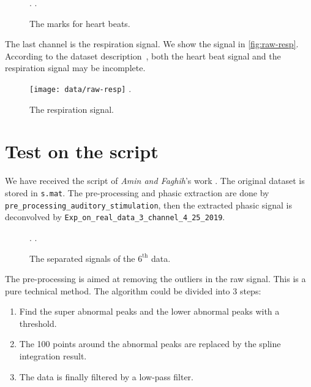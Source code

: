 \documentclass[]{article}
\begin{document}
\begin{figure}[htbp]
  \centering
  \DeclareGraphicsExtensions.
  \DeclareGraphicsExtensions.
  \caption{The marks for heart beats.} \label{fig:raw-hb}
\end{figure}

The last channel is the respiration signal. We show the signal in \autoref{fig:raw-resp}. According to the dataset description~\cite{bach2014pspm}, both the heart beat signal and the respiration signal may be incomplete.

\begin{figure}[htbp]
  \centering
  \texttt{[image: data/raw-resp]}
  \DeclareGraphicsExtensions.
  \caption{The respiration signal.} \label{fig:raw-resp}
\end{figure}

\section{Test on the script}

We have received the script of \textit{Amin and Faghih}'s work \cite{amin2019robust}. The original dataset is stored in \texttt{s.mat}. The pre-processing and phasic extraction are done by \texttt{pre\_processing\_auditory\_stimulation}, then the extracted phasic signal is deconvolved by \texttt{Exp\_on\_real\_data\_3\_channel\_4\_25\_2019}.

\begin{figure}[htbp]
  \centering
  \DeclareGraphicsExtensions.
  \DeclareGraphicsExtensions.
  \caption{The separated signals of the $6^{\mathrm{th}}$ data.} \label{fig:sep-signal}
\end{figure}

The pre-processing is aimed at removing the outliers in the raw signal. This is a pure technical method. The algorithm could be divided into 3 steps:

\begin{enumerate}
  \item Find the super abnormal peaks and the lower abnormal peaks with a threshold.
  \item The 100 points around the abnormal peaks are replaced by the spline integration result.
  \item The data is finally filtered by a low-pass filter.
\end{enumerate}
\end{document}
